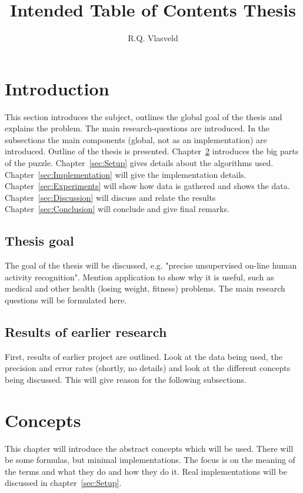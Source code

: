 \documentclass[a4paper,10pt]{extarticle}
\author{R.Q. Vlasveld}
\title{Intended Table of Contents Thesis}
\begin{document}
\maketitle
\tableofcontents

\section{Introduction}
\label{sec:Introduction}
This section introduces the subject, outlines the global goal of the thesis and explains the problem.
The main research-questions are introduced.
In the subsections the main components (global, not as an implementation) are introduced.
Outline of the thesis is presented.
Chapter~\ref{sec:Concepts} introduces the big parts of the puzzle.
Chapter~\ref{sec:Setup} gives details about the algorithms used.
Chapter~\ref{sec:Implementation} will give the implementation details.
Chapter~\ref{sec:Experiments} will show how data is gathered and shows the data.
Chapter~\ref{sec:Discussion} will discuss and relate the results
Chapter~\ref{sec:Conclusion} will conclude and give final remarks.


  \subsection{Thesis goal}
  The goal of the thesis will be discussed, e.g. "precise unsupervised on-line human activity recognition".
  Mention application to show why it is useful, such as medical and other health (losing weight, fitness) problems.
  The main research questions will be formulated here.

  \subsection{Results of earlier research}
  First, results of earlier project are outlined. Look at the data being used, the precision and error rates (shortly, no details) and look at the different concepts being discussed.
  This will give reason for the following subsections.

\section{Concepts}
\label{sec:Concepts}
This chapter will introduce the abstract concepts which will be used.
There will be some formulas, but minimal implementations.
The focus is on the meaning of the terms and what they do and how they do it.
Real implementations will be discussed in chapter~\ref{sec:Setup}.
\end{document}
